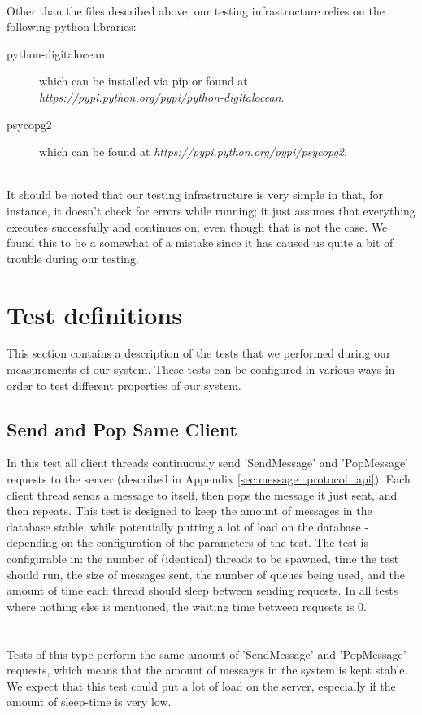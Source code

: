 \documentclass{article}
\begin{document}
        \\
        Other than the files described above, our testing infrastructure relies on the following python libraries: 
        \begin{description}
            \item[python-digitalocean] which can be installed via pip or found at \textit{https://pypi.python.org/pypi/python-digitalocean}.
            \item[psycopg2] which can be found at \textit{https://pypi.python.org/pypi/psycopg2}.
        \end{description}
        ~\\
        It should be noted that our testing infrastructure is very simple in that, for instance, it doesn't check for errors while running; it just assumes that everything executes successfully and continues on, even though that is not the case. We found this to be a somewhat of a mistake since it has caused us quite a bit of trouble during our testing.

    \section{Test definitions}
        \label{sec:test_definitions}
        This section contains a description of the tests that we performed during our measurements of our system. These tests can be configured in various ways in order to test different properties of our system.

        \subsection{Send and Pop Same Client}
            In this test all client threads continuously send 'SendMessage' and 'PopMessage' requests to the server (described in Appendix \ref{sec:message_protocol_api}). Each client thread sends a message to itself, then pops the message it just sent, and then repeats. This test is designed to keep the amount of messages in the database stable, while potentially putting a lot of load on the database - depending on the configuration of the parameters of the test. The test is configurable in: the number of (identical) threads to be spawned, time the test should run, the size of messages sent, the number of queues being used, and the amount of time each thread should sleep between sending requests. In all tests where nothing else is mentioned, the waiting time between requests is 0.\\
            \\
            \\
            Tests of this type perform the same amount of 'SendMessage' and 'PopMessage' requests, which means that the amount of messages in the system is kept stable. We expect that this test could put a lot of load on the server, especially if the amount of sleep-time is very low.
\end{document}
